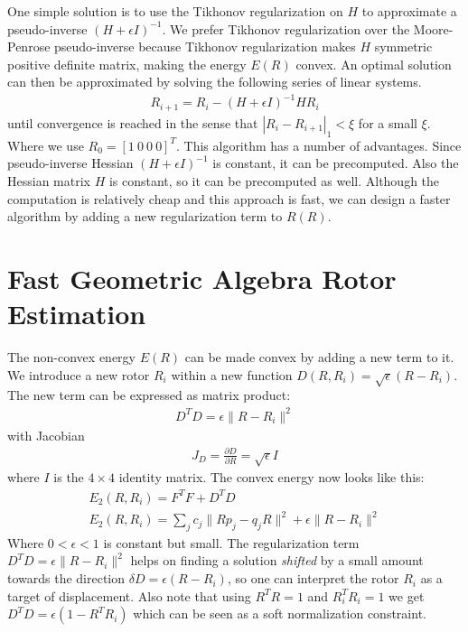 \documentclass{birkjour}
\numberwithin{equation}{section}
\begin{document}
One simple solution is to use the Tikhonov regularization on $H$ to approximate a pseudo-inverse $(H + \epsilon I)^{-1}$. We prefer Tikhonov regularization over the Moore-Penrose pseudo-inverse because Tikhonov regularization makes $H$ symmetric positive definite matrix, making the energy $E(R)$ convex. An optimal solution can then be approximated by solving the following series of linear systems.
\begin{eqnarray*}
R_{i+1} = R_i - (H + \epsilon I)^{-1} H R_i
\end{eqnarray*}
until convergence is reached in the sense that $|R_i - R_{i+1}|_1 < \xi$ for a small $\xi$. Where we use $R_0 = [1 \ 0 \ 0 \ 0]^T$. This algorithm has a number of advantages. Since pseudo-inverse Hessian $(H + \epsilon I)^{-1}$ is constant, it can be precomputed. Also the Hessian matrix $H$ is constant, so it can be precomputed as well. Although the computation is relatively cheap and this approach is fast, we can design a faster algorithm by adding a new regularization term to $R(R)$.

\section{Fast Geometric Algebra Rotor Estimation}

The non-convex energy $E(R)$ can be made convex by adding a new term to it. We introduce a new rotor $R_i$ within a new function $D(R, R_i) = \sqrt{\epsilon} (R - R_i)$.
The new term can be expressed as matrix product:
\begin{eqnarray*}
D^T D = \epsilon \|R - R_i\|^2
\end{eqnarray*}
with Jacobian 
\begin{eqnarray*}
J_D = \frac{\partial D}{\partial R} = \sqrt{\epsilon} I
\end{eqnarray*}
where $I$ is the $4\times4$ identity matrix. The convex energy now looks like this:
\begin{eqnarray*}
E_2(R, R_i) = F^T F + D^T D\\
E_2(R, R_i) = \sum_j { c_{j} \|R p_j - q_j R\|^2 } + \epsilon \|R - R_i\|^2
\end{eqnarray*}
Where $0 < \epsilon < 1$ is constant but small. The regularization term $D^T D = \epsilon \|R - R_i\|^2$ helps on finding a solution \emph{shifted} by a small amount towards the direction $\delta D = \epsilon (R - R_i)$, so one can interpret the rotor $R_i$ as a target of displacement. Also note that using $R^T R = 1$ and $R_i^T R_i = 1$ we get $D^T D = \epsilon (1 - R^T R_i)$ which can be seen as a soft normalization constraint.
\end{document}
